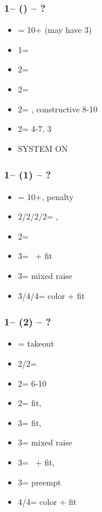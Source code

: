 \documentclass[12pt, a4paper]{report}
\begin{document}
\subsubsection*{1\spades -- (\dbl) -- ?}
\begin{itemize}
    \item \rdbl = 10+ (may have 3\spades)
    \item 1\nt = \trsf{2\clubs}
    \item 2\clubs = \trsf{2\diams}
    \item 2\diams = \trsf{2\hearts}
    \item 2\hearts = \trsf{2\spades}, constructive 8-10
    \item 2\spades = 4-7, 3\spades
    \item \small{SYSTEM ON}
\end{itemize}

\subsubsection*{1\spades -- (1\nt) -- ?}
\begin{itemize}
    \item \dbl = 10+, penalty
    \item 2\clubs/2\diams/2\hearts/2\spades = \nat, \nf
    \item 2\nt = \minor
    \item 3\clubs = \inv\ + fit
    \item 3\diams = mixed raise
    \item 3\hearts/4\clubs/4\diams = color + fit
\end{itemize}

\subsubsection*{1\spades -- (2\clubs) -- ?}
\begin{itemize}
    \item \dbl = takeout
    \item 2\diams/2\hearts = \fonce
    \item 2\spades = 6-10
    \item 2\nt = fit, \gf
    \item 3\clubs = fit, \inv
    \item 3\diams = mixed raise
    \item 3\hearts = \hearts\ + fit, \inv
    \item 3\spades = preempt
    \item 4\diams/4\hearts = color + fit
\end{itemize}
\end{document}
